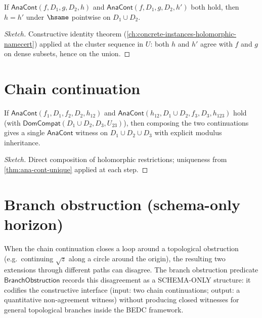 \begin{theorem}
\label{thm:ana-cont-unique}
If \(\mathsf{AnaCont}(f, D_1, g, D_2, h)\) and \(\mathsf{AnaCont}(f, D_1, g, D_2, h')\) both hold, then \(h = h'\) under \(\hsame\) pointwise on \(D_1 \cup D_2\).
\end{theorem}
\begin{proof}[Sketch]
Constructive identity theorem (\autoref{ch:concrete-instances-holomorphic-namecert}) applied at the cluster sequence in \(U\): both \(h\) and \(h'\) agree with \(f\) and \(g\) on dense subsets, hence on the union.
\end{proof}

\section{Chain continuation}

\begin{theorem}
\label{thm:chain-continuation}
If \(\mathsf{AnaCont}(f_1, D_1, f_2, D_2, h_{12})\) and \(\mathsf{AnaCont}(h_{12}, D_1 \cup D_2, f_3, D_3, h_{123})\) hold (with \(\mathsf{DomCompat}(D_1 \cup D_2, D_3, U_{23})\)), then composing the two continuations gives a single \(\mathsf{AnaCont}\) witness on \(D_1 \cup D_2 \cup D_3\) with explicit modulus inheritance.
\end{theorem}
\begin{proof}[Sketch]
Direct composition of holomorphic restrictions; uniqueness from \autoref{thm:ana-cont-unique} applied at each step.
\end{proof}

\section{Branch obstruction (schema-only horizon)}

\begin{definition}
\label{def:branch-obstruction-schema}
When the chain continuation closes a loop around a topological obstruction (e.g.\ continuing \(\sqrt{z}\) along a circle around the origin), the resulting two extensions through different paths can disagree. The branch obstruction predicate \(\mathsf{BranchObstruction}\) records this disagreement as a SCHEMA-ONLY structure: it codifies the constructive interface (input: two chain continuations; output: a quantitative non-agreement witness) without producing closed witnesses for general topological branches inside the BEDC framework.
\end{definition}

